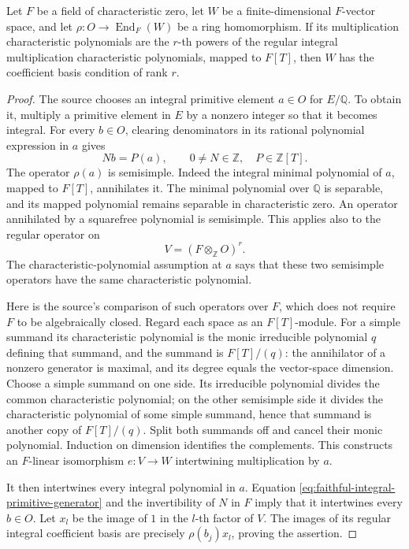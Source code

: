 \begin{srlemma}
\label{lem:faithful-free-charzero}
Let \(F\) be a field of characteristic zero, let \(W\) be a
finite-dimensional \(F\)-vector space, and let
\(\rho:O\to\operatorname{End}_F(W)\) be a ring homomorphism.
If its multiplication characteristic polynomials are the
\(r\)-th powers of the regular integral multiplication
characteristic polynomials, mapped to \(F[T]\), then \(W\) has
the coefficient basis condition of rank \(r\).
\end{srlemma}
\begin{proof}
The source  chooses an integral
primitive element \(a\in O\) for \(E/\mathbb Q\).
To obtain it, multiply a primitive element in \(E\) by a nonzero
integer so that it becomes integral.
For every \(b\in O\), clearing denominators in its rational
polynomial expression in \(a\) gives
\[
                    N b=P(a),\qquad
                    0\ne N\in\mathbb Z,\quad P\in\mathbb Z[T].
 \tag{ST1}\label{eq:faithful-integral-primitive-generator}
\]
The operator \(\rho(a)\) is semisimple.
Indeed the integral minimal polynomial of \(a\), mapped to \(F[T]\),
annihilates it.  The minimal polynomial over \(\mathbb Q\) is
separable, and its mapped polynomial remains separable in
characteristic zero.  An operator annihilated by a squarefree
polynomial is semisimple.  This applies also to the regular
operator on
\[
                       V=(F\otimes_{\mathbb Z}O)^r.
\]
The characteristic-polynomial assumption at \(a\) says that
these two semisimple operators have the same characteristic
polynomial.

Here is the source's comparison of such operators over \(F\),
which does not require \(F\) to be algebraically closed.
Regard each space as an \(F[T]\)-module.
For a simple summand its characteristic polynomial is the monic
irreducible polynomial \(q\) defining that summand, and the
summand is \(F[T]/(q)\): the annihilator of a nonzero generator
is maximal, and its degree equals the vector-space dimension.
Choose a simple summand on one side.  Its irreducible polynomial
divides the common characteristic polynomial; on the other
semisimple side it divides the characteristic polynomial of some
simple summand, hence that summand is another copy of \(F[T]/(q)\).
Split both summands off and cancel their monic polynomial.
Induction on dimension identifies the complements.
This constructs an \(F\)-linear isomorphism \(e:V\to W\)
intertwining multiplication by \(a\).

It then intertwines every integral polynomial in \(a\).
Equation \eqref{eq:faithful-integral-primitive-generator} and the
invertibility of \(N\) in \(F\) imply that it intertwines every
\(b\in O\).  Let \(x_l\) be the image of \(1\) in the \(l\)-th
factor of \(V\).  The images of its regular integral coefficient
basis are precisely \(\rho(b_j)x_l\), proving the assertion.
\end{proof}

